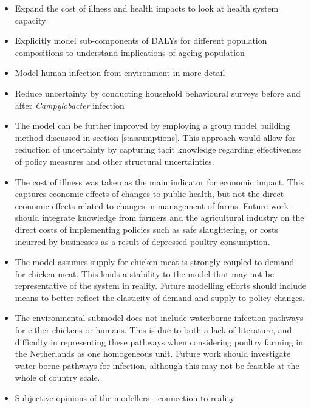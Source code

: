 \begin{itemize}
    \item Expand the cost of illness and health impacts to look at health system capacity
    \item Explicitly model sub-components of DALYs for different population compositions to understand implications of ageing population
    \item Model human infection from environment in more detail
    \item Reduce uncertainty by conducting household behavioural surveys before and after \textit{Campylobacter} infection
    \item The model can be further improved by employing a group model building method discussed in section \ref{s:assumptions}. This approach would allow for reduction of uncertainty by capturing tacit knowledge regarding effectiveness of policy measures and other structural uncertainties.
    \item The cost of illness was taken as the main indicator for economic impact. This captures economic effects of changes to public health, but not the direct economic effects related to changes in management of farms. Future work should integrate knowledge from farmers and the agricultural industry on the direct costs of implementing policies such as safe slaughtering, or costs incurred by businesses as a result of depressed poultry consumption.
    \item The model assumes supply for chicken meat is strongly coupled to demand for chicken meat. This lends a stability to the model that may not be representative of the system in reality. Future modelling efforts should include means to better reflect the elasticity of demand and supply to policy changes.
    \item The environmental submodel does not include waterborne infection pathways for either chickens or humans. This is due to both a lack of literature, and difficulty in representing these pathways when considering poultry farming in the Netherlands as one homogeneous unit. Future work should investigate water borne pathways for infection, although this may not be feasible at the whole of country scale. 
    \item Subjective opinions of the modellers - connection to reality
\end{itemize}
\fi
